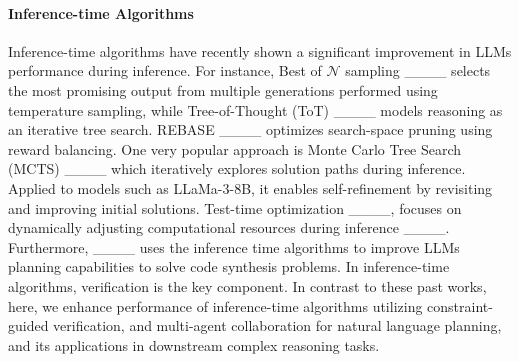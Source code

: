 \paragraph{Inference-time Algorithms}

Inference-time algorithms have recently shown a significant improvement in LLMs performance during inference. For instance, Best of $\mathcal{N}$ sampling ____ selects the most promising output from multiple generations performed using temperature sampling, while Tree-of-Thought (ToT) ____ models reasoning as an iterative tree search. REBASE ____ optimizes search-space pruning using reward balancing. One very popular approach is Monte Carlo Tree Search (MCTS) ____ which iteratively explores solution paths during inference. Applied to models such as LLaMa-3-8B, it enables self-refinement by revisiting and improving initial solutions. Test-time optimization ____, focuses on dynamically adjusting computational resources during inference ____. Furthermore, ____ uses the inference time algorithms to improve LLMs planning capabilities to solve code synthesis problems. In inference-time algorithms, verification is the key component. In contrast to these past works, here, we enhance performance of inference-time algorithms utilizing constraint-guided verification, and multi-agent collaboration for natural language planning, and its applications in downstream complex reasoning tasks.




